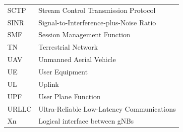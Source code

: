 \begin{longtable}{p{2.8cm}p{11.2cm}}
SCTP & Stream Control Transmission Protocol\\
SINR & Signal-to-Interference-plus-Noise Ratio\\
SMF & Session Management Function\\
TN & Terrestrial Network\\
UAV & Unmanned Aerial Vehicle\\
UE & User Equipment\\
UL & Uplink\\
UPF & User Plane Function\\
URLLC & Ultra-Reliable Low-Latency Communications\\
Xn & Logical interface between gNBs\\
\end{longtable}

\newpage
